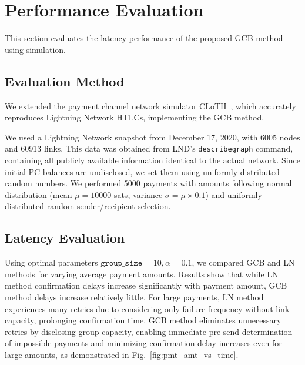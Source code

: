 \documentclass[conference]{IEEEtran}
\newcommand{\groupsize}{\texttt{group\_size}}
\begin{document}
\section{Performance Evaluation}

This section evaluates the latency performance of the proposed GCB method using simulation.

\subsection{Evaluation Method}

We extended the payment channel network simulator CLoTH~\cite{CONOSCENTI2021100717}, which accurately reproduces Lightning Network HTLCs, implementing the GCB method.

We used a Lightning Network snapshot from December 17, 2020, with 6005 nodes and 60913 links. This data was obtained from LND's \texttt{describegraph} command, containing all publicly available information identical to the actual network. Since initial PC balances are undisclosed, we set them using uniformly distributed random numbers. We performed 5000 payments with amounts following normal distribution (mean $\mu = 10000$ sats, variance $\sigma = \mu \times 0.1$) and uniformly distributed random sender/recipient selection.

\subsection{Latency Evaluation}

Using optimal parameters $\groupsize=10, \alpha=0.1$, we compared GCB and LN methods for varying average payment amounts. Results show that while LN method confirmation delays increase significantly with payment amount, GCB method delays increase relatively little. For large payments, LN method experiences many retries due to considering only failure frequency without link capacity, prolonging confirmation time. GCB method eliminates unnecessary retries by disclosing group capacity, enabling immediate pre-send determination of impossible payments and minimizing confirmation delay increases even for large amounts, as demonstrated in Fig.~\ref{fig:pmt_amt_vs_time}.
\end{document}

